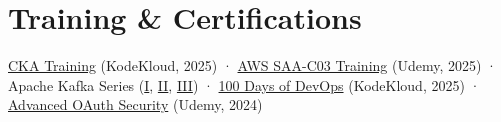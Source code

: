 \section*{Training \& Certifications}
\BigDivider
\noindent
\href{https://www.udemy.com/certificate/UC-246987b5-df13-4f9b-a53f-d74d9de0d221/}{CKA Training} (KodeKloud, 2025) · \href{https://www.udemy.com/certificate/UC-b1ef5d20-5c70-472f-a936-96567f299af7/}{AWS SAA-C03 Training} (Udemy, 2025) · Apache Kafka Series (\href{https://www.udemy.com/certificate/UC-ec3b908f-9983-4510-bdb1-bc1fb5567a2d/}{I}, \href{https://www.udemy.com/certificate/UC-6c2275bc-4236-441a-9cb6-de7ada31a3c8/}{II}, \href{https://www.udemy.com/certificate/UC-1e1e34e9-0ba4-4c9d-bf10-3b5b16ee6f10/}{III}) · \href{https://engineer.kodekloud.com/certificate-verification/8a2e35fb-02fd-4082-aff3-d1fbc291f0d1}{100 Days of DevOps} (KodeKloud, 2025) · \href{https://www.udemy.com/certificate/UC-57aa3ba1-44be-4d7d-ab4b-e232f489411d/}{Advanced OAuth Security} (Udemy, 2024)
